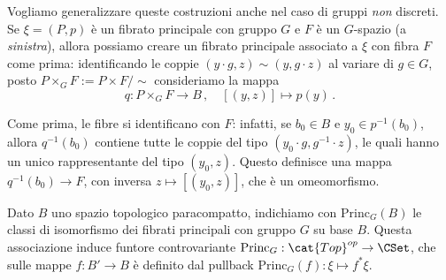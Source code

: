 Vogliamo generalizzare queste costruzioni anche nel caso di gruppi \emph{non} discreti.
Se $\xi = (P,p)$ è un fibrato principale con gruppo $G$ e
$F$ è un $G$-spazio (a \emph{sinistra}),
allora possiamo creare un fibrato principale associato a $\xi$ con fibra $F$ come prima:
identificando le coppie $(y \cdot g,z) \sim (y, g \cdot z)$
al variare di $g \in G$, posto $P \times_{G} F := P \times F/\sim$
consideriamo la mappa
\begin{equation*}
	q : P \times_{G} F  %
	\longrightarrow B\,,
	\quad {[(y,z)]} \longmapsto p(y)\,.
\end{equation*}

Come prima, le fibre si identificano con $F$: infatti, se $b_{0} \in B$ e $y_{0} \in p^{-1}(b_{0})$,
allora $q^{-1}(b_{0})$ contiene tutte le coppie del tipo $(y_{0} \cdot g ,g^{-1} \cdot z)$,
le quali hanno un unico rappresentante del tipo $(y_{0},z)$.
Questo definisce una mappa $q^{-1}(b_{0}) \to F$, con inversa $z \mapsto [(y_{0},z)]$,
che è un omeomorfismo.

\begin{df}
	Dato $B$ uno spazio topologico paracompatto, indichiamo con
	$\mathrm{Princ}_{G}(B)$ le classi di isomorfismo dei fibrati principali 
	con gruppo $G$ su base $B$. Questa associazione induce
	funtore controvariante $\mathrm{Princ}_{G}:\cat{Top}^{op} \to \CSet$,
	che sulle mappe $f:B' \to B$ è definito dal pullback 
	$\mathrm{Princ}_{G}(f) : \xi \mapsto f^{*}\xi$.
\end{df}



